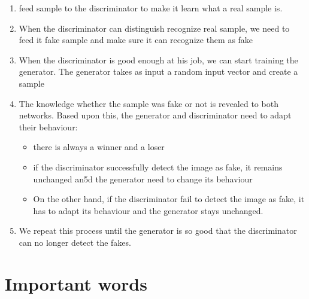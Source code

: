 \documentclass{article}
\begin{document}
\begin{enumerate}
    \item feed sample to the discriminator to make it learn what a real sample is.
    \item When the discriminator can distinguish recognize real sample, we need to feed it fake sample and make sure it can recognize them as fake
    \item When the discriminator is good enough at his job, we can start training the generator. The generator takes as input a random input vector and create a sample
    \item The knowledge whether the sample was fake or not is revealed to both networks. Based upon this, the generator and discriminator need to adapt their behaviour:
    \begin{itemize}
        \item there is always a winner and a loser
        \item if the discriminator successfully detect the image as fake, it remains unchanged an5d the generator need to change its behaviour 
        \item On the other hand, if the discriminator fail to detect the image as fake, it has to adapt its behaviour and the generator stays unchanged. 
    \end{itemize}
    \item We repeat this process until the generator is so good that the discriminator can no longer detect the fakes.
\end{enumerate}

\section{Important words}
\end{document}
